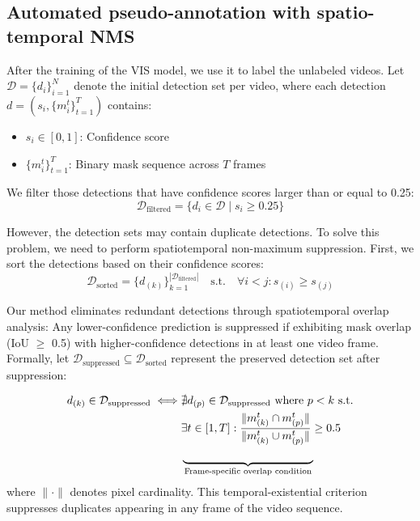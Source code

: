 \subsection{Automated pseudo-annotation with spatio-temporal NMS}

After the training of the VIS model, we use it to label the unlabeled videos. 
Let $\mathcal{D} = \{d_i\}^{N}_{i=1}$ denote the initial detection set per video, where each detection $d = (s_i, \{m_i^t\}^{T}_{t=1})$ contains:
\begin{itemize}
    \item $s_i \in [0,1]$: Confidence score
    \item $\{m_i^t\}^{T}_{t=1}$: Binary mask sequence across $T$ frames
\end{itemize}

We filter those detections that have confidence scores larger than or equal to 0.25:
\begin{equation}
    \mathcal{D}_{\text{filtered}} = \{ d_i \in \mathcal{D} \mid s_i \geq 0.25 \}
\end{equation}

However, the detection sets may contain duplicate detections. To solve this problem, we need to perform spatiotemporal non-maximum suppression. First, we sort the detections based on their confidence scores:
\begin{equation}
    \mathcal{D}_{\text{sorted}} = \{ d_{(k)} \}_{k=1}^{|\mathcal{D}_{\text{filtered}}|} \quad \text{s.t.} \quad \forall i < j: s_{(i)} \geq s_{(j)}
\end{equation}

Our method eliminates redundant detections through spatiotemporal overlap analysis: Any lower-confidence prediction is suppressed if exhibiting mask overlap (IoU $\geq$ 0.5) with higher-confidence detections in at least one video frame. Formally, let $\mathcal{D}_{\text{suppressed}} \subseteq \mathcal{D}_{\text{sorted}}$ represent the preserved detection set after suppression:

\begin{equation}
\begin{split}
d_{(k)} \in \mathcal{D}_{\text{suppressed}} \iff & \nexists d_{(p)} \in \mathcal{D}_{\text{suppressed}} \ \text{where} \ p < k \ \text{s.t.} \\
& \exists t \in [1,T] : \frac{\|m_{(k)}^t \cap m_{(p)}^t\|}{\|m_{(k)}^t \cup m_{(p)}^t\|} \geq 0.5 \\
& \underbrace{\hphantom{\exists t \in [1,T] : \frac{\|m_{(k)}^t \cap m_{(p)}^t\|}{\|m_{(k)}^t \cup m_{(p)}^t\|}}}_{\mathclap{\text{Frame-specific overlap condition}}}
\end{split}
\end{equation}
where $\| \cdot \|$ denotes pixel cardinality. This temporal-existential criterion suppresses duplicates appearing in any frame of the video sequence.

